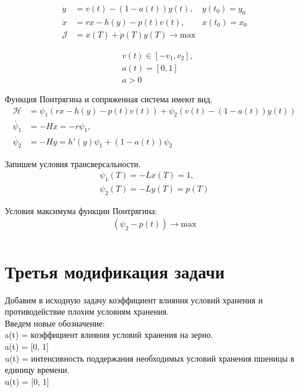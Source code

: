 \begin{align}
    \Dot{y} & = v(t) - (1 - a(t)) y(t), & y(t_{0}) = y_{0} \\
    \Dot{x} & = r x - h(y) - p(t) v(t), & x(t_{0}) = x_{0} \\
    \mathcal{J} & = x(T) + p(T) y(T) \to \mathrm{max}
\end{align}

\begin{align}
    & v(t) \in [-v_{1}, v_{2}], \\
    & a(t) = [0, 1]\\
    & a > 0
\end{align}

Функция Понтрягина и сопряженная система имеют вид. 
\begin{align}
    \mathcal{H} & = \psi_{1} (r x- h(y) - p(t) v(t)) + \psi_{2} (v(t) - (1-a(t))y(t))\\
    \Dot{\psi_{1}} & = -H x = -r \psi_{1},\\
    \Dot{\psi_{2}} & = -H y = h'(y) \psi_{1} + (1- a(t))\psi_{2}
\end{align} 

Запишем  условия трансверсальности.
\begin{align}
    {\psi_{1}(T)} = - {L}x(T)= 1,\\
    {\psi_{2}(T)} = - {L}y(T)= p(T)
\end{align} 


Условия максимума функции Понтрягина:\\
\begin{align}
     (\psi_{2} - p(t)) \to \mathrm{max}\\
\end{align}

\section{Третья модификация задачи}

Добавим в исходную задачу коэффициент влияния условий хранения и противодействие плохим условиям хранения.\\

Введем новые обозначение:\\
{a(t)} = коэффициент влияния условий хранения на зерно.\\
a(t) = [0, 1]\\
{u(t)} = интенсивность поддержания необходимых условий хранения пшеницы в единицу времени.\\
u(t) = [0, 1]\\

